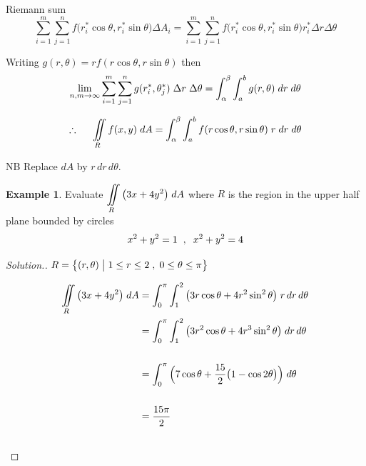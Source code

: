 \documentclass[11pt,a4paper]{article}
\theoremstyle{definition}
\newtheorem{exa}[thm]{Example}
\newenvironment{solution}
  {\renewcommand{\qedsymbol}{}\begin{proof}[\textit{Solution}.]}
  {\end{proof}}
\begin{document}
Riemann sum
$$\sum^m_{i=1}\sum^n_{j=1} f\big(r^*_i\cos \theta , r^*_i\sin \theta \big) \Delta A_i = \sum^m_{i=1}\sum^n_{j=1} f\big(r^*_i\cos \theta , r^*_i\sin \theta \big)r^*_i \Delta r \Delta \theta$$

Writing $\displaystyle{g(r,\theta) = r f(r\cos \theta, r \sin \theta)}$ then $$\lim_{n,m\rightarrow \infty} \sum^m_{i=1}\sum^n_{j=1}g(r^*_i, \theta^*_j)\hspace{0.1cm} \Delta r\hspace{0.1cm} \Delta \theta = \int^{\beta}_{\alpha} \int^b_a g(r,\theta)\hspace{0.1cm}dr\hspace{0.1cm}d\theta$$

$$\therefore\hspace{0.5cm} \iint\limits_R f(x,y)\hspace{0.1cm}dA = \int^{\beta}_{\alpha} \int^b_a f(r\cos \theta, r\sin \theta)\hspace{0.1cm} r\hspace{0.1cm} dr\hspace{0.1cm} d\theta$$

NB Replace $dA$ by $r\,dr\,d\theta$.


\begin{exa}


Evaluate $\displaystyle{\iint\limits_R \big(3x + 4y^2\big) \hspace{0.1cm}dA}$ where $R$ is the region in the upper half plane bounded by circles $$x^2 + y^2 = 1\hspace{0.2cm} , \hspace{0.2cm} x^2 + y^2 = 4$$
\end{exa}


\begin{solution}


$\displaystyle{R = \big\{ (r,\theta) \hspace{0.1cm} \big|\hspace{0.1cm} 1 \leq r \leq 2\hspace{0.1cm} ,\hspace{0.1cm} 0\leq \theta \leq \pi\big\}}$

\begin{align*}
\iint\limits_R \big(3x + 4y^2\big) \hspace{0.1cm}dA & = \int^{\pi}_0\int^2_1\big(3r\cos \theta + 4r^2\sin^2 \theta \big)\hspace{0.1cm} r\,dr\,d\theta\\
& =\int^{\pi}_0\int^2_1\big(3r^2\cos \theta + 4r^3\sin^2 \theta \big)\hspace{0.1cm} dr\,d\theta\\\\
& = \int^{\pi}_0\Big(7\cos \theta + \frac{15}{2}\big( 1 - \cos 2\theta \big)\Big)\hspace{0.1cm}d\theta\\\\
& = \frac{15\pi}{2}\\\\
\end{align*}
\end{solution}
\end{document}
